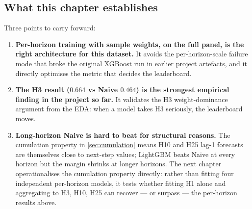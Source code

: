 \subsection{What this chapter establishes}
\label{sec:lgbm:conclusions}

Three points to carry forward:

\begin{enumerate}
  \item \textbf{Per-horizon training with sample weights, on the full panel, is the right architecture for this dataset.} It avoids the per-horizon-scale failure mode that broke the original XGBoost run in earlier project artefacts, and it directly optimises the metric that decides the leaderboard.
  \item \textbf{The H3 result ($0.664$ vs Naive $0.464$) is the strongest empirical finding in the project so far.} It validates the H3 weight-dominance argument from the EDA: when a model takes H3 seriously, the leaderboard moves.
  \item \textbf{Long-horizon Naive is hard to beat for structural reasons.} The cumulation property in \cref{sec:cumulation} means H10 and H25 lag-1 forecasts are themselves close to next-step values; LightGBM beats Naive at every horizon but the margin shrinks at longer horizons. The next chapter operationalises the cumulation property directly: rather than fitting four independent per-horizon models, it tests whether fitting H1 alone and aggregating to H3, H10, H25 can recover --- or surpass --- the per-horizon results above.
\end{enumerate}
